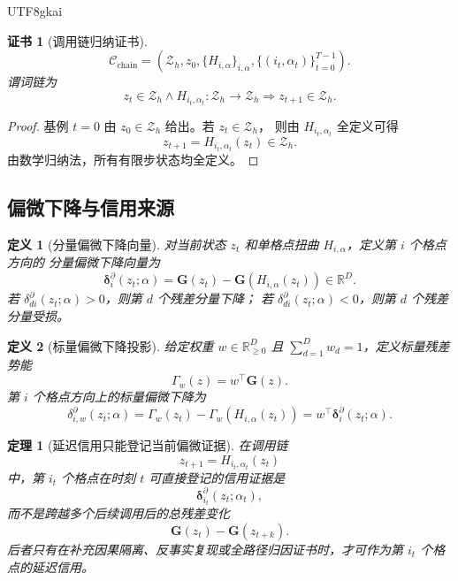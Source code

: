 \documentclass[12pt]{article}
\newtheorem{definition}{定义}[section]
\newtheorem{theorem}{定理}[section]
\newtheorem{Certificate}{证书}[section]
\newcommand{\RR}{\mathbb{R}}
\begin{document}
\begin{CJK*}{UTF8}{gkai}
\begin{Certificate}[调用链归纳证书]
\[
  \mathcal C_{\mathrm{chain}}
  =
  \left(
  \mathcal Z_h,
  z_0,
  \{H_{i,\alpha}\}_{i,\alpha},
  \{(i_t,\alpha_t)\}_{t=0}^{T-1}
  \right).
\]
谓词链为
\[
  z_t\in\mathcal Z_h
  \wedge
  H_{i_t,\alpha_t}:\mathcal Z_h\to\mathcal Z_h
  \Longrightarrow
  z_{t+1}\in\mathcal Z_h .
\]
\end{Certificate}

\begin{proof}
基例 \(t=0\) 由 \(z_0\in\mathcal Z_h\) 给出。若 \(z_t\in\mathcal Z_h\)，
则由 \(H_{i_t,\alpha_t}\) 全定义可得
\[
  z_{t+1}=H_{i_t,\alpha_t}(z_t)\in\mathcal Z_h .
\]
由数学归纳法，所有有限步状态均全定义。
\end{proof}

\subsection{偏微下降与信用来源}
\label{subsec:lhts-partial-credit}

\begin{definition}[分量偏微下降向量]
\label{def:lhts-partial-descent}
对当前状态 \(z_t\) 和单格点扭曲 \(H_{i,\alpha}\)，定义第 \(i\) 个格点方向的
分量偏微下降向量为
\[
  \boxed{
  \boldsymbol\delta_i^\partial(z_t;\alpha)
  =
  \mathbf G(z_t)-\mathbf G(H_{i,\alpha}(z_t))
  \in\RR^D
  } .
\]
若 \(\delta_{di}^\partial(z_t;\alpha)>0\)，则第 \(d\) 个残差分量下降；
若 \(\delta_{di}^\partial(z_t;\alpha)<0\)，则第 \(d\) 个残差分量受损。
\end{definition}

\begin{definition}[标量偏微下降投影]
给定权重 \(w\in\RR_{\ge0}^{D}\) 且 \(\sum_{d=1}^{D}w_d=1\)，定义标量残差势能
\[
  \Gamma_w(z)=w^\top\mathbf G(z).
\]
第 \(i\) 个格点方向上的标量偏微下降为
\[
  \delta_{i,w}^{\partial}(z_t;\alpha)
  =
  \Gamma_w(z_t)-\Gamma_w(H_{i,\alpha}(z_t))
  =
  w^\top\boldsymbol\delta_i^\partial(z_t;\alpha).
\]
\end{definition}

\begin{theorem}[延迟信用只能登记当前偏微证据]
\label{thm:lhts-credit-boundary}
在调用链
\[
  z_{t+1}=H_{i_t,\alpha_t}(z_t)
\]
中，第 \(i_t\) 个格点在时刻 \(t\) 可直接登记的信用证据是
\[
  \boldsymbol\delta_{i_t}^\partial(z_t;\alpha_t),
\]
而不是跨越多个后续调用后的总残差变化
\[
  \mathbf G(z_t)-\mathbf G(z_{t+k}) .
\]
后者只有在补充因果隔离、反事实复现或全路径归因证书时，才可作为第 \(i_t\)
个格点的延迟信用。
\end{theorem}


\end{CJK*}
\end{document}
